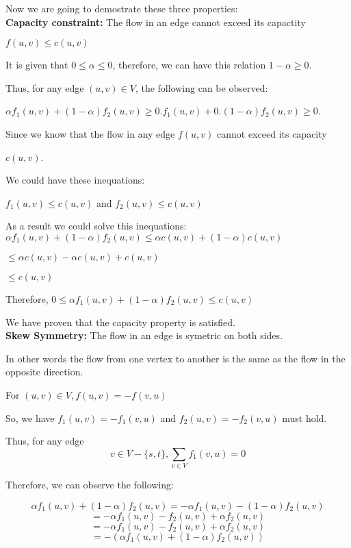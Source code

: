 \documentclass[12]{article}
\begin{document}
Now we are going to demostrate these three properties:\\


\textbf{Capacity constraint: } The flow in  an edge cannot exceed its capactity


$f(u,v) \leqslant c(u,v)$

It is given that $0 \leqslant \alpha \leqslant 0 $, therefore, we can have this relation $1 - \alpha \geqslant 0$. 

Thus, for any edge $(u,v) \in V$, the following can be observed:

$\alpha f_1(u,v) + (1 - \alpha)f_2(u,v) \geqslant 0.f_1(u,v) + 0.(1 - \alpha)f_2(u,v) \geqslant 0$. 

Since we know that the flow in any edge $f(u,v)$ cannot exceed its capacity 

$c(u,v)$. 

We could have these inequations: 

$f_1(u,v) \leqslant c(u,v)$ and $f_2(u,v) \leqslant c(u,v)$ 

As a result we could solve this inequations: \\

$\alpha f_1(u,v) + ( 1 - \alpha)f_2(u,v) \leqslant  \alpha c(u,v) + (1 - \alpha)c(u,v)$

$\leqslant \alpha c(u,v) - \alpha c(u,v) + c(u,v)$

$\leqslant c(u,v)$

Therefore,  $0 \leqslant \alpha f_1(u,v) + ( 1 - \alpha) f_2(u,v) \leqslant c(u,v)$

We have proven that the capacity  property is satisfied. \\


\textbf{Skew Symmetry: } The flow in  an edge is symetric on both sides.

In other words the flow from one vertex to another is the same as the flow in the opposite direction.

For $(u,v) \in V, f(u,v) = -f(v,u)$

So, we have $f_1(u,v) = -f_1(v,u)$ and $f_2(u,v) = -f_2(v,u)$ must hold.

Thus, for any edge $$ v \in V-\lbrace s,t \rbrace, \sum_{v \in V}f_1(v,u) = 0$$

Therefore, we can observe the following:

$$ \alpha f_1(u,v) + ( 1 - \alpha)f_2(u,v) =  - \alpha f_1(u,v) - (1 - \alpha)f_2(u,v)$$
$$ = -\alpha f_1(u,v) - f_2(u,v) + \alpha f_2(u,v)$$
$$ = - \alpha f_1(u,v) - f_2(u,v) + \alpha f_2(u,v) $$
$$ = -( \alpha f_1(u,v) + ( 1 - \alpha)f_2(u,v)) $$
\end{document}
